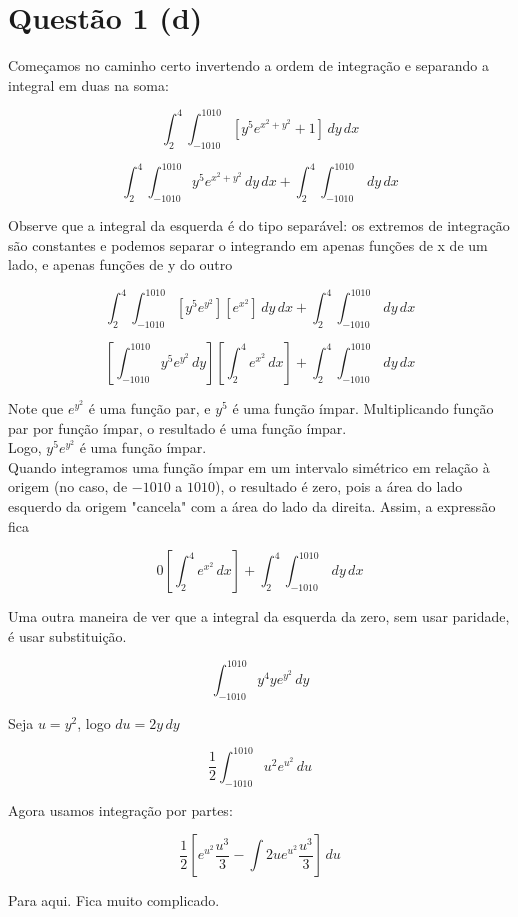 \section*{Questão 1 (d)}

Começamos no caminho certo invertendo a ordem de integração e separando a integral em duas na soma:

\[ \int_{2}^{4} \int_{-1010}^{1010} \left[y^5e^{x^2+y^2} + 1\right] \, dy \, dx \]

\[ \int_{2}^{4} \int_{-1010}^{1010} y^5e^{x^2+y^2} \, dy \, dx + \int_{2}^{4} \int_{-1010}^{1010} \, dy \, dx \]

Observe que a integral da esquerda é do tipo separável: os extremos de integração são constantes 
e podemos separar o integrando em apenas funções de x de um lado, e apenas funções de y do outro 

\[ \int_{2}^{4} \int_{-1010}^{1010} \left[y^5 e^{y^2}\right] \left[e^{x^2}\right] \, dy \, dx + \int_{2}^{4} \int_{-1010}^{1010} \, dy \, dx \]

\[ \left[\int_{-1010}^{1010} y^5 e^{y^2} \, dy\right] \left[\int_{2}^{4} e^{x^2} \, dx\right]  + \int_{2}^{4} \int_{-1010}^{1010} \, dy \, dx \]

Note que $e^{y^2}$ é uma função par, e $y^5$ é uma função ímpar. Multiplicando função par por função ímpar, 
o resultado é uma função ímpar. \\

Logo,  $y^5 e^{y^2}$ é uma função ímpar.  \\

Quando integramos uma função ímpar em um intervalo simétrico em relação à origem (no caso, de $-1010$ a $1010$), o resultado é zero, pois a área 
do lado esquerdo da origem "cancela" com a área do lado da direita. Assim, a expressão fica  

\[ 0 \left[\int_{2}^{4} e^{x^2} \, dx\right]  + \int_{2}^{4} \int_{-1010}^{1010} \, dy \, dx \]

Uma outra maneira de ver que a integral da esquerda da zero, sem usar paridade, é usar substituição.

\[ \int_{-1010}^{1010} y^4 y e^{y^2} \, dy \]

Seja $u = y^2$, logo $du = 2y \, dy$

\[ \frac{1}{2} \int_{-1010}^{1010} u^2 e^{u^2} \, du \]

Agora usamos integração por partes:

\[ \frac{1}{2} \left[ e^{u^2} \frac{u^3}{3} - \int 2ue^{u^2} \frac{u^3}{3} \right] \, du \]

Para aqui. Fica muito complicado.



